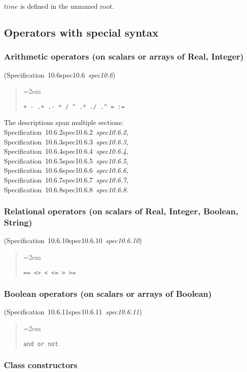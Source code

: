 \documentclass[10pt,b5paper]{article}
\def\specrefx#1#2{Specification~#1\ifx\relax#2\relax{}\else~{\it{}#2}\fi}
\def\specref#1{\specrefx{#1}{\csname spec#1\endcsname}}
\begin{document}
\noindent $\mathit{time}$ is defined in the unnamed root.


\subsection{Operators with special syntax}

\subsubsection*{Arithmetic operators (on scalars or arrays of Real, Integer)}

(\specref{10.6}\/)

\begin{quote}
\spaceskip=2em
\begin{verbatim}
+ - .+ .- * / ^ .* ./ .^ = :=
\end{verbatim}
\end{quote}

\noindent The descriptions span multiple sections:
\specref{10.6.2},
\specref{10.6.3},
\specref{10.6.4},
\specref{10.6.5},
\specref{10.6.6},
\specref{10.6.7},
\specref{10.6.8}.

\subsubsection*{Relational operators (on scalars of Real, Integer, Boolean, String)}

(\specref{10.6.10}\/)

\begin{quote}
\spaceskip=2em
\begin{verbatim}
== <> < <= > >=
\end{verbatim}
\end{quote}

\subsubsection*{Boolean operators (on scalars or arrays of Boolean)}

(\specref{10.6.11}\/)

\begin{quote}
\spaceskip=2em
\begin{verbatim}
and or not
\end{verbatim}
\end{quote}

\subsubsection*{Class constructors}
\end{document}
